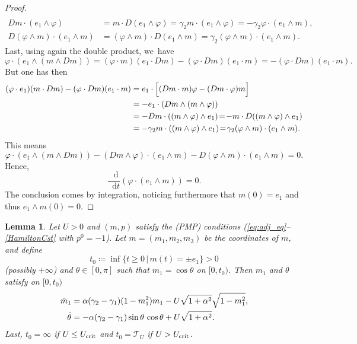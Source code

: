\documentclass[10pt]{amsart}
\newtheorem{lemma}[theorem]{Lemma}
\theoremstyle{definition}
\newcommand*\diff{\mathop{}\!\mathrm{d}}
\begin{document}
\begin{proof}
\begin{align*}
\\
Dm \cdot (e_1 \wedge \varphi) &= m \cdot D(e_1 \wedge \varphi) = \gamma_2 m \cdot (e_1 \wedge \varphi) = - \gamma_2 \varphi \cdot (e_1 \wedge m), \\
D (\varphi \wedge m) \cdot (e_1 \wedge m) &= (\varphi \wedge m) \cdot D (e_1 \wedge m) = \gamma_2 (\varphi \wedge m) \cdot (e_1 \wedge m).
\end{align*}
Last, using again the double product, we~have
\begin{equation*}
\varphi \cdot (e_1 \wedge (m \wedge Dm)) = (\varphi \cdot m) (e_1 \cdot Dm) - (\varphi \cdot Dm) (e_1 \cdot m) = - (\varphi \cdot Dm) (e_1 \cdot m).
\end{equation*}
But one has then
\begin{align*}
(\varphi \cdot e_1) (m \cdot Dm) - (\varphi \cdot Dm) (e_1 \cdot m) &= e_1 \cdot \Bigl[ (Dm \cdot m) \varphi - (Dm \cdot \varphi) m \Bigr] \\
& = -e_1 \cdot (Dm \wedge (m \wedge \varphi)) \\
&= -Dm \cdot ((m \wedge \varphi) \wedge e_1) \!=\! -m \cdot D ((m \wedge \varphi) \wedge e_1) \\
&= -\gamma_2 m \cdot ((m \wedge \varphi) \wedge e_1) \!=\! \gamma_2 (\varphi \wedge m) \cdot (e_1 \wedge m).
\end{align*}
This means
\begin{equation*}
\varphi \cdot (e_1 \wedge (m \wedge Dm)) - (Dm \wedge \varphi) \cdot (e_1 \wedge m) - D (\varphi \wedge m) \cdot (e_1 \wedge m) = 0.
\end{equation*}
Hence,
\begin{equation*}
\frac{\diff}{\diff t} (\varphi \cdot (e_1 \wedge m)) = 0.
\end{equation*}
The conclusion comes by integration, noticing furthermore that $m(0) = e_1$ and thus $e_1 \wedge m(0) = 0$.
\end{proof}

\begin{lemma} \label{lem:m1_theta_odes}
Let $U > 0$ and $(m, p)$ satisfy the (PMP) conditions (\eqref{eq:adj_eq}--\eqref{HamiltonCst} with $p^0 = -1$). Let $m=(m_1,m_2,m_3)$ be the coordinates of $m$, and define
\[
t_0 \coloneqq \inf \{ t \geq 0 \, | \, m (t) = \pm e_1 \} > 0
\]
(possibly $+ \infty$) and $\theta \in [0, \pi]$ such that $m_1 = \cos \theta$ on $[0, t_0)$. Then $m_1$ and $\theta$ satisfy on $[0, t_0)$
\begin{align}
\dot{m}_1 &= \alpha (\gamma_2 - \gamma_1) (1 - m_1^2) m_1 - U \sqrt{1 + \alpha^2} \sqrt{1 - m_1^2},\notag
\\
\label{eq:theta_ode}
\dot{\theta} &= - \alpha (\gamma_2 - \gamma_1) \sin{\theta} \, \cos{\theta} + U \sqrt{1 + \alpha^2}.
\end{align}
Last, $t_0 = \infty$ if $U \leq U_\textnormal{crit}$ and $t_0 = \mathcal{T}_U$ if $U > U_\textnormal{crit}$.
\end{lemma}
\end{document}

